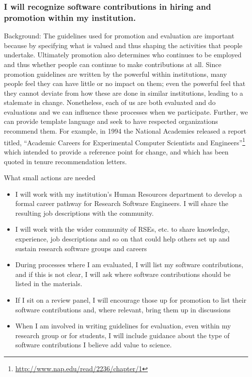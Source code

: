 \documentclass[a4paper,UKenglish]{dagman}
\renewcommand{\paragraph}[1]{\subsubsection*{#1}\xspace}
\begin{document}
\paragraph{I will recognize software contributions in hiring and promotion within my institution.}

Background:
The guidelines used for promotion and evaluation are important because by specifying what is valued and thus shaping the activities that people undertake. Ultimately promotion also determines who continues to be employed and thus whether people can continue to make contributions at all. Since promotion guidelines are written by the powerful within institutions, many people feel they can have little or no impact on them; even the powerful feel that they cannot deviate from how these are done in similar institutions, leading to a stalemate in change. Nonetheless, each of us are both evaluated and do evaluations and we can influence these processes when we participate. Further, we can provide template language and seek to have respected organizations recommend them. For example, in 1994 the National Academies released a report titled, ``Academic Careers for Experimental Computer Scientists and Engineers''\footnote{\url{http://www.nap.edu/read/2236/chapter/1}} which intended to provide a reference point for change, and which has been quoted in tenure recommendation letters.

What small actions are needed
\begin{itemize}
\item I will work with my institution's Human Resources department to develop a formal career pathway for Research Software Engineers. I will share the resulting job descriptions with the community.
\item I will work with the wider community of RSEs, etc. to share knowledge, experience, job descriptions and so on that could help others set up and sustain research software groups and careers
\item During processes where I am evaluated, I will list my software contributions, and if this is not clear, I will ask where software contributions should be listed in the materials.
\item If I sit on a review panel, I will encourage those up for promotion to list their software contributions and, where relevant, bring them up in discussions
\item When I am involved in writing guidelines for evaluation, even within my research group or for students, I will include guidance about the type of software contributions I believe add value to science. 
\end{itemize}
\end{document}
